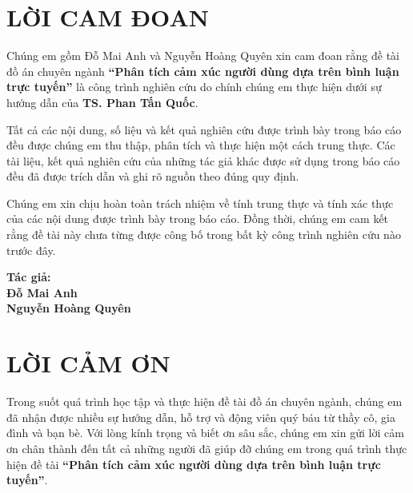 \documentclass[14pt, a4paper]{report}
\begin{document}



\pagestyle{frontmatter}

\chapter*{LỜI CAM ĐOAN}

Chúng em gồm Đỗ Mai Anh và Nguyễn Hoàng Quyên xin cam đoan rằng đề tài đồ án chuyên ngành \textbf{``Phân tích cảm xúc người dùng dựa trên bình luận trực tuyến''} là công trình nghiên cứu do chính chúng em thực hiện dưới sự hướng dẫn của \textbf{TS. Phan Tấn Quốc}.

Tất cả các nội dung, số liệu và kết quả nghiên cứu được trình bày trong báo cáo đều được chúng em thu thập, phân tích và thực hiện một cách trung thực. Các tài liệu, kết quả nghiên cứu của những tác giả khác được sử dụng trong báo cáo đều đã được trích dẫn và ghi rõ nguồn theo đúng quy định.

Chúng em xin chịu hoàn toàn trách nhiệm về tính trung thực và tính xác thực của các nội dung được trình bày trong báo cáo. Đồng thời, chúng em cam kết rằng đề tài này chưa từng được công bố trong bất kỳ công trình nghiên cứu nào trước đây.

\vspace{2cm}

\hfill \textbf{Tác giả:} \\
\hfill \textbf{Đỗ Mai Anh} \\
\hfill \textbf{Nguyễn Hoàng Quyên}

\newpage

\chapter*{LỜI CẢM ƠN}

Trong suốt quá trình học tập và thực hiện đề tài đồ án chuyên ngành, chúng em đã nhận được nhiều sự hướng dẫn, hỗ trợ và động viên quý báu từ thầy cô, gia đình và bạn bè. Với lòng kính trọng và biết ơn sâu sắc, chúng em xin gửi lời cảm ơn chân thành đến tất cả những người đã giúp đỡ chúng em trong quá trình thực hiện đề tài \textbf{``Phân tích cảm xúc người dùng dựa trên bình luận trực tuyến''}.
\end{document}
